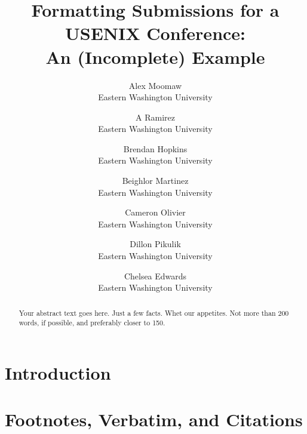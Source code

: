 \documentclass[letterpaper,twocolumn,10pt]{article}
\begin{document}

\date{}

\title{\Large \bf Formatting Submissions for a USENIX Conference:\\
  An (Incomplete) Example}

\author{
{\rm Alex Moomaw}\\
Eastern Washington University
\and
{\rm A Ramirez}\\
Eastern Washington University
\and
{\rm Brendan Hopkins}\\
Eastern Washington University
\and
{\rm Beighlor Martinez}\\
Eastern Washington University
\and
{\rm Cameron Olivier}\\
Eastern Washington University
\and
{\rm Dillon Pikulik}\\
Eastern Washington University
\and
{\rm Chelsea Edwards}\\
Eastern Washington University




} %

\maketitle

\begin{abstract}
Your abstract text goes here. Just a few facts. Whet our appetites.
Not more than 200 words, if possible, and preferably closer to 150.
\end{abstract}


\section{Introduction}


\section{Footnotes, Verbatim, and Citations}

\end{document}
